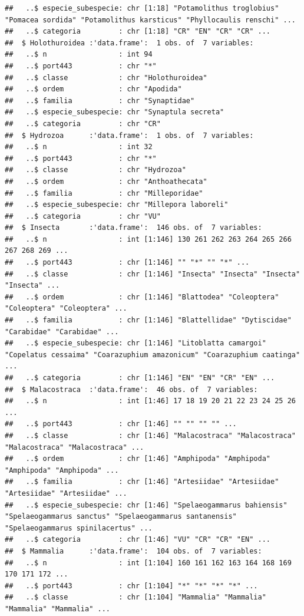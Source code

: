 \documentclass[
]{article}
\begin{document}
\begin{verbatim}
##   ..$ especie_subespecie: chr [1:18] "Potamolithus troglobius" "Pomacea sordida" "Potamolithus karsticus" "Phyllocaulis renschi" ...
##   ..$ categoria         : chr [1:18] "CR" "EN" "CR" "CR" ...
##  $ Holothuroidea :'data.frame':  1 obs. of  7 variables:
##   ..$ n                 : int 94
##   ..$ port443           : chr "*"
##   ..$ classe            : chr "Holothuroidea"
##   ..$ ordem             : chr "Apodida"
##   ..$ familia           : chr "Synaptidae"
##   ..$ especie_subespecie: chr "Synaptula secreta"
##   ..$ categoria         : chr "CR"
##  $ Hydrozoa      :'data.frame':  1 obs. of  7 variables:
##   ..$ n                 : int 32
##   ..$ port443           : chr "*"
##   ..$ classe            : chr "Hydrozoa"
##   ..$ ordem             : chr "Anthoathecata"
##   ..$ familia           : chr "Milleporidae"
##   ..$ especie_subespecie: chr "Millepora laboreli"
##   ..$ categoria         : chr "VU"
##  $ Insecta       :'data.frame':  146 obs. of  7 variables:
##   ..$ n                 : int [1:146] 130 261 262 263 264 265 266 267 268 269 ...
##   ..$ port443           : chr [1:146] "" "*" "" "*" ...
##   ..$ classe            : chr [1:146] "Insecta" "Insecta" "Insecta" "Insecta" ...
##   ..$ ordem             : chr [1:146] "Blattodea" "Coleoptera" "Coleoptera" "Coleoptera" ...
##   ..$ familia           : chr [1:146] "Blattellidae" "Dytiscidae" "Carabidae" "Carabidae" ...
##   ..$ especie_subespecie: chr [1:146] "Litoblatta camargoi" "Copelatus cessaima" "Coarazuphium amazonicum" "Coarazuphium caatinga" ...
##   ..$ categoria         : chr [1:146] "EN" "EN" "CR" "EN" ...
##  $ Malacostraca  :'data.frame':  46 obs. of  7 variables:
##   ..$ n                 : int [1:46] 17 18 19 20 21 22 23 24 25 26 ...
##   ..$ port443           : chr [1:46] "" "" "" "" ...
##   ..$ classe            : chr [1:46] "Malacostraca" "Malacostraca" "Malacostraca" "Malacostraca" ...
##   ..$ ordem             : chr [1:46] "Amphipoda" "Amphipoda" "Amphipoda" "Amphipoda" ...
##   ..$ familia           : chr [1:46] "Artesiidae" "Artesiidae" "Artesiidae" "Artesiidae" ...
##   ..$ especie_subespecie: chr [1:46] "Spelaeogammarus bahiensis" "Spelaeogammarus sanctus" "Spelaeogammarus santanensis" "Spelaeogammarus spinilacertus" ...
##   ..$ categoria         : chr [1:46] "VU" "CR" "CR" "EN" ...
##  $ Mammalia      :'data.frame':  104 obs. of  7 variables:
##   ..$ n                 : int [1:104] 160 161 162 163 164 168 169 170 171 172 ...
##   ..$ port443           : chr [1:104] "*" "*" "*" "*" ...
##   ..$ classe            : chr [1:104] "Mammalia" "Mammalia" "Mammalia" "Mammalia" ...

\end{verbatim}
\end{document}

